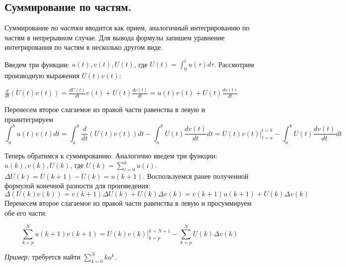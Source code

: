 \subsection{Суммирование по частям.}
Суммирование \emph{по частям} вводится как прием, аналогичный интегрированию по частям в непрерывном случае. Для вывода формулы
запишем уравнение интегрирования по частям в несколько другом виде.

Введем три функции: $\displaystyle u(t), v(t), U(t)$, где $\displaystyle U(t) = \int_{0}^{t}u(\tau)d\tau$.
Рассмотрим производную выражения $U(t)v(t)$:

$\displaystyle \frac{d}{dt}\left(U(t)v(t)\right) = \frac{dU(t)}{dt}v(t) + U(t)\frac{dv(t)}{dt} = u(t)v(t) + U(t)\frac{dv(t)}{dt}$
\vspace{5pt}

Перенесем второе слагаемое из правой части равенства в левую и проинтегрируем
\begin{equation*}
    \int_a^b u(t)v(t)dt = \int_a^b \frac{d}{dt}\left(U(t)v(t)\right)dt - \int_a^b U(t) \frac{dv(t)}{dt}dt = U(t)v(t) \biggr\rvert_{t=a}^{t=b} - \int_a^b U(t)\frac{dv(t)}{dt}dt
\end{equation*}

Теперь обратимся к суммированию. Аналогично введем три функции: $\displaystyle u(k), v(k), U(k)$, где
$\displaystyle U(k) = \sum_{i=0}^k u(i)$. $\displaystyle \Delta U(k) = U(k+1) - U(k) = u(k+1)$.
Воспользуемся ранее полученной формулой конечной разности для произведения:
\begin{equation*}
    \Delta \left(U(k)v(k)\right) = v(k+1) \Delta U(k) + U(k)\Delta v(k) = v(k+1)u(k+1) + U(k)\Delta v(k)
\end{equation*}
Перенесем второе слагаемое из правой части равенства в левую и просуммируем обе его части:

\begin{theorem}
    \begin{equation}
        \sum_{k=p}^N u(k+1)v(k+1) = U(k)v(k) \bigg\rvert_{k=p}^{k=N+1} - \sum_{k=p}^N U(k) \Delta v(k)\label{eq:abel}
    \end{equation}
\end{theorem}

\emph{Пример:} требуется найти $\displaystyle \sum_{k=0}^N ka^k$.


